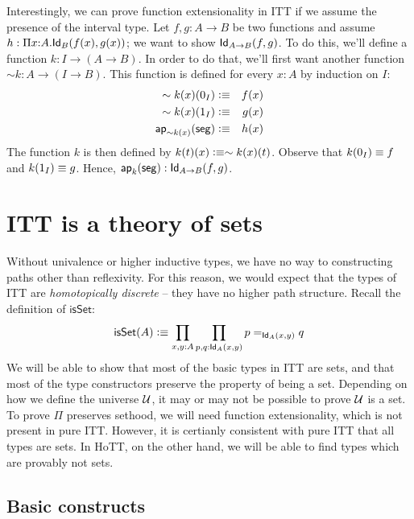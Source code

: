 \documentclass[11pt]{article}
\newcommand*{\Izero}{0_I}
\newcommand*{\Ione}{1_I}
\newcommand*{\Iseg}{\mathsf{seg}}
\newcommand*{\ap}{\mathsf{ap}}
\newcommand*{\isSet}{\mathsf{isSet}}
\begin{document}
Interestingly, we can prove function extensionality in ITT if we assume the
presence of the interval type. Let $f , g : A \to B$ be two functions and
assume $h : \Pi x{:}A. \mathsf{Id}_{B} (f(x), g(x))$; we want to show $\mathsf{Id}_{A\to
B}(f,g)$. To do this, we'll define a function $k : I \to (A \to B)$. In
order to do that, we'll first want another function 
$\sim{k} : A \to (I \to B)$. 
This function is defined for every $x : A$ by induction on $I$:
\begin{eqnarray*} \sim{k}(x)(\Izero) &\defeq& f(x) \\ \sim{k}(x)(\Ione)
&\defeq& g(x) \\ \ap_{\sim{k}(x)}(\Iseg) &\defeq& h(x) \end{eqnarray*} The
function $k$ is then defined by $k(t)(x) \vcentcolon\equiv \sim{k}(x)(t)$. Observe that
$k(\Izero) \jdeq f$ and $k(\Ione) \jdeq g$. Hence, $\ap_k(\Iseg) : \Id{A
\to B}(f,g)$.

\section{ITT is a theory of sets}

Without univalence or higher inductive types, we have no way to constructing paths other than reflexivity. For this reason, we would expect that the types of ITT are \emph{homotopically discrete} -- they have no higher path structure. Recall the definition of $\isSet$:
\[
\isSet(A) \defeq \prod_{x,y:A} \prod_{p,q:\Id{A}(x,y)} p =_{\Id{A}(x,y)} q 
\]
We will be able to show that most of the basic types in ITT are sets, and that most of the type constructors preserve the property of being a set. Depending on how we define the universe $\mathcal{U}$, it may or may not be possible to prove $\mathcal{U}$ is a set. To prove $\Pi$ preserves sethood, we will need function extensionality, which is not present in pure ITT. However, it is certianly consistent with pure ITT that all types are sets. In HoTT, on the other hand, we will be able to find types which are provably not sets.

\subsection*{Basic constructs}
\end{document}
